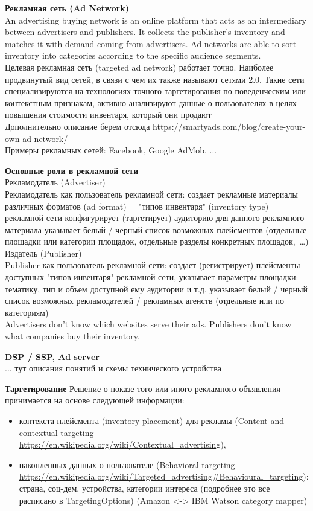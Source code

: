 \documentclass[times]{itmo-student-thesis}
\begin{document}

\textbf{Рекламная сеть (Ad Network)}
\\
An advertising buying network is an online platform that acts as an intermediary between advertisers and publishers. It collects the publisher's inventory and matches it with demand coming from advertisers. Ad networks are able to sort inventory into categories according to the specific audience segments.
\\
Целевая рекламная сеть (targeted ad network) работает точно. Наиболее продвинутый вид сетей, в связи с чем их также называют сетями 2.0. Такие сети специализируются на технологиях точного таргетирования по поведенческим или контекстным признакам, активно анализируют данные о пользователях в целях повышения стоимости инвентаря, который они продают
\\
Дополнительно описание берем отсюда https://smartyads.com/blog/create-your-own-ad-network/
\\
Примеры рекламных сетей: Facebook, Google AdMob, ...


\textbf{Основные роли в рекламной сети}
\\
Рекламодатель (Advertiser)
\\
Рекламодатель как пользователь рекламной сети:
создает рекламные материалы различных форматов (ad format) = "типов инвентаря" (inventory type) рекламной сети
конфигурирует (таргетирует) аудиторию для данного рекламного материала
указывает белый / черный список возможных плейсментов (отдельные площадки или категории площадок, отдельные разделы конкретных площадок, …)
\\
Издатель (Publisher)
\\
Publisher как пользователь рекламной сети:
создает (регистрирует) плейсменты доступных "типов инвентаря" рекламной сети, указывает параметры площадки: тематику, тип и объем доступной ему аудитории и т.д.
указывает белый / черный список возможных рекламодателей / рекламных агенств (отдельные или по категориям)
\\
Advertisers don't know which websites serve their ads. Publishers don't know what companies buy their inventory.


\textbf{DSP / SSP, Ad server}
\\
... тут описания понятий и схемы технического устройства


\textbf{Таргетирование}
Решение о показе того или иного рекламного объявления принимается на основе следующей информации:
\begin{itemize}
	\item контекста плейсмента (inventory placement) для рекламы (Content and contextual targeting - \url{https://en.wikipedia.org/wiki/Contextual_advertising}),
	\item накопленных данных о пользователе (Behavioral targeting - \url{https://en.wikipedia.org/wiki/Targeted_advertising#Behavioural_targeting}): страна, соц-дем, устройства, категории интереса (подробнее это все расписано в TargetingOptions) (Amazon <-> IBM Watson category mapper)
\end{itemize}
\bigbreak
\end{document}
